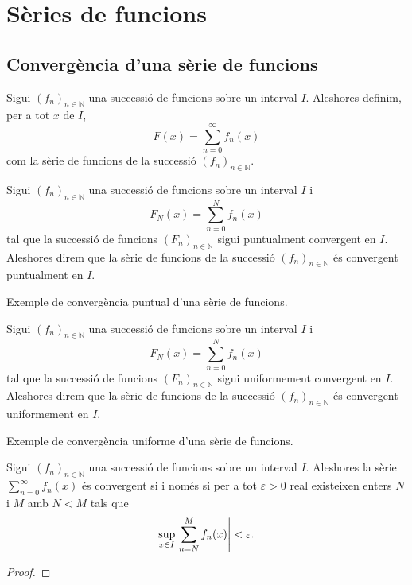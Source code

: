 \documentclass[../../Main.tex]{subfiles}
\begin{document}
\section{Sèries de funcions}
	\subsection{Convergència d'una sèrie de funcions}
	\begin{definition}
		Sigui \((f_{n})_{n\in\mathbb{N}}\) una successió de funcions sobre un interval \(I\). Aleshores definim, per a tot \(x\) de \(I\),
		\[F(x)=\sum_{n=0}^{\infty}f_{n}(x)\]
		com la sèrie de funcions de la successió \((f_{n})_{n\in\mathbb{N}}\).
	\end{definition}
	\begin{definition}
		\label{def:convergència puntual d'una sèrie de funcions}
		Sigui \((f_{n})_{n\in\mathbb{N}}\) una successió de funcions sobre un interval \(I\) i
		\[F_{N}(x)=\sum_{n=0}^{N}f_{n}(x)\]
		tal que la successió de funcions \((F_{n})_{n\in\mathbb{N}}\) sigui puntualment convergent en \(I\). Aleshores direm que la sèrie de funcions de la successió \((f_{n})_{n\in\mathbb{N}}\) és convergent puntualment en \(I\).
	\end{definition}
	\begin{example}
		Exemple de convergència puntual d'una sèrie de funcions.
		\begin{solution}
		\end{solution}
	\end{example}
	\begin{definition}
		\label{def:convergència uniforme d'una sèrie de funcions}
		Sigui \((f_{n})_{n\in\mathbb{N}}\) una successió de funcions sobre un interval \(I\) i
		\[F_{N}(x)=\sum_{n=0}^{N}f_{n}(x)\]
		tal que la successió de funcions \((F_{n})_{n\in\mathbb{N}}\) sigui uniformement convergent en \(I\). Aleshores direm que la sèrie de funcions de la successió \((f_{n})_{n\in\mathbb{N}}\) és convergent uniformement en \(I\).
	\end{definition}
	\begin{example}
		Exemple de convergència uniforme d'una sèrie de funcions.
		\begin{solution}
		\end{solution}
	\end{example}
	\begin{theorem}
		\label{def:condició de Cauchy per sèries de funcions}
		Sigui \((f_{n})_{n\in\mathbb{N}}\) una successió de funcions sobre un interval \(I\). Aleshores la sèrie \(\sum_{n=0}^{\infty}f_{n}(x)\) és convergent si i només si per a tot \(\varepsilon>0\) real existeixen enters \(N\) i \(M\) amb \(N<M\) tals que
		\[\sup_{x\in I}\abs{\sum_{n=N}^{M}f_{n}(x)}<\varepsilon.\]
		\begin{proof}
		\end{proof}
	\end{theorem}
\end{document}

